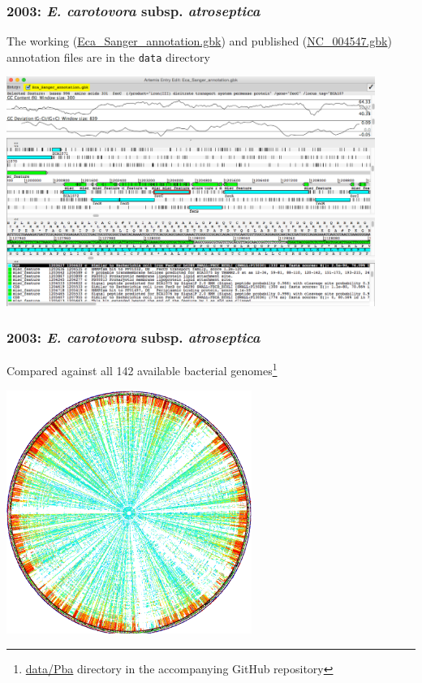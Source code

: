 \begin{frame}
  \frametitle{2003: \textit{E. carotovora} subsp. \textit{atroseptica}}
  The working (\url{Eca_Sanger_annotation.gbk}) and published (\url{NC_004547.gbk}) annotation files are in the \texttt{data} directory
  \begin{center}
    \includegraphics[width=0.9\textwidth]{images/pba_artemis}
  \end{center}    
\end{frame}

\begin{frame}
  \frametitle{2003: \textit{E. carotovora} subsp. \textit{atroseptica}}
  Compared against all 142 available bacterial genomes\footnote{\tiny{\url{data/Pba} directory in the accompanying GitHub repository}}
  \begin{center}
    \includegraphics[width=0.6\textwidth]{images/pba_400_circular}
  \end{center}    
\end{frame}

